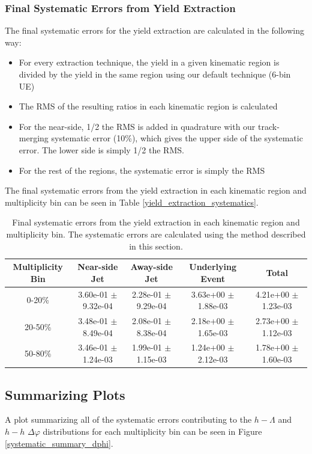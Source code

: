 \documentclass[ALICE,manyauthors]{ALICE_analysis_notes}
\begin{document}
\subsubsection{Final Systematic Errors from Yield Extraction}
The final systematic errors for the yield extraction are calculated in the following way:
\begin{itemize}
\item For every extraction technique, the yield in a given kinematic region is divided by the yield in the same region using our default technique (6-bin UE)
\item The RMS of the resulting ratios in each kinematic region is calculated
\item For the near-side, 1/2 the RMS is added in quadrature with our track-merging systematic error (10\%), which gives the upper side of the systematic error. The lower side is simply 1/2 the RMS.
\item For the rest of the regions, the systematic error is simply the RMS
\end{itemize}

The final systematic errors from the yield extraction in each kinematic region and multiplicity bin can be seen in Table \ref{yield_extraction_systematics}.

\begin{table}[h!]
\centering
\begin{tabular}{| c | c | c | c | c | }
\hline
Multiplicity Bin & Near-side Jet & Away-side Jet & Underlying Event & Total  \\
\hline

0-20\% & 3.60e-01 $\pm$ 9.32e-04 & 2.28e-01 $\pm$ 9.29e-04 & 3.63e+00 $\pm$ 1.88e-03 & 4.21e+00 $\pm$ 1.23e-03 \\
20-50\% & 3.48e-01 $\pm$ 8.49e-04 & 2.08e-01 $\pm$ 8.38e-04 & 2.18e+00 $\pm$ 1.65e-03 & 2.73e+00 $\pm$ 1.12e-03 \\
50-80\% & 3.46e-01 $\pm$ 1.24e-03 & 1.99e-01 $\pm$ 1.15e-03 & 1.24e+00 $\pm$ 2.12e-03 & 1.78e+00 $\pm$ 1.60e-03 \\

\hline
\end{tabular}
\caption{Final systematic errors from the yield extraction in each kinematic region and multiplicity bin. The systematic errors are calculated using the method described in this section.}
\label{h_h_yield_table_6bin_nonzero}
\end{table}


\subsection{Summarizing Plots}
A plot summarizing all of the systematic errors contributing to the $h-\Lambda$ and $h-h$ $\Delta\varphi$ distributions for each multiplicity bin can be seen in Figure \ref{systematic_summary_dphi}. 
\end{document}
